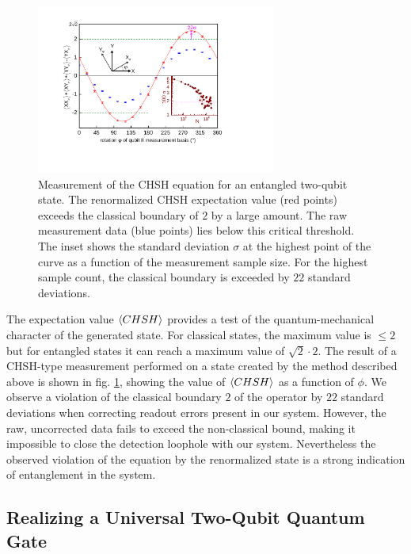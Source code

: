 \begin{figure}[ht!]
	\centering
		\includegraphics[width=0.7\textwidth]{./material/papers/iswap/submission1/Dewes_Figure3}
	\caption[Measurement of the CHSH operator of an entanged two-qubit state]{Measurement of the CHSH equation for an entangled two-qubit state. The renormalized CHSH expectation value (red points) exceeds the classical boundary of $2$ by a large amount. The raw measurement data (blue points) lies below this critical threshold. The inset shows the standard deviation $\sigma$ at the highest point of the curve as a function of the measurement sample size. For the highest sample count, the classical boundary is exceeded by $22$ standard deviations.}
	\label{fig:chsh_measurement}
\end{figure}

The expectation value $\left< CHSH \right>$ provides a test of the quantum-mechanical character of the generated state. For classical states, the maximum value is $\le 2$ but for entangled states it can reach a maximum value of $\sqrt{2}\cdot 2$. The result of a CHSH-type measurement performed on a state created by the method described above is shown in fig. \ref{fig:chsh_measurement}, showing the value of $\left< CHSH \right>$ as a function of $\phi$. We observe a violation of the classical boundary $2$ of the operator by $22$ standard deviations when correcting readout errors present in our system. However, the raw, uncorrected data fails to exceed the non-classical bound, making it impossible to close the detection loophole with our system. Nevertheless the observed violation of the equation by the renormalized state is a strong indication of entanglement in the system.

\subsection{Realizing a Universal Two-Qubit Quantum Gate}

